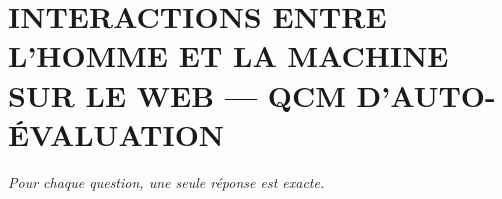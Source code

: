 
\section*{\textcolor{chapcolor}{\MakeUppercase{Interactions entre l'homme et la machine sur le Web — QCM d'auto-évaluation}}}

\begin{center}
\textit{Pour chaque question, une seule réponse est exacte.}
\end{center}

